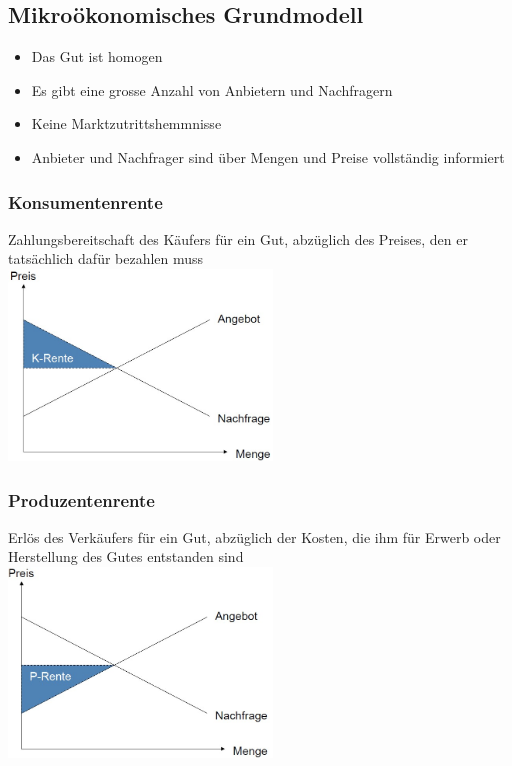 \subsection{Mikroökonomisches Grundmodell}
\begin{itemize}
	\item Das Gut ist homogen
	\item Es gibt eine grosse Anzahl von Anbietern und Nachfragern
	\item Keine Marktzutrittshemmnisse
	\item Anbieter und Nachfrager sind über Mengen und Preise vollständig informiert
\end{itemize}
\begin{multicols}{2}
	\subsubsection{Konsumentenrente}
	Zahlungsbereitschaft des Käufers für ein Gut,
	abzüglich des Preises, den er tatsächlich dafür bezahlen muss\\
	\includegraphics[width=7cm]{images/kr.jpg}
	\subsubsection{Produzentenrente}
	Erlös des Verkäufers für ein Gut, abzüglich der
	Kosten, die ihm für Erwerb oder Herstellung des Gutes entstanden sind\\
	\includegraphics[width=7cm]{images/pr.jpg}
\end{multicols}
